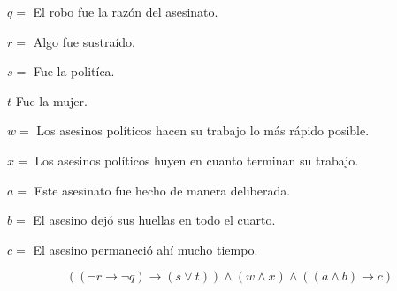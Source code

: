 \documentclass[
]{article}
\begin{document}
\(q=\) El robo fue la razón del asesinato.

\(r=\) Algo fue sustraído.

\(s=\) Fue la politíca.

\(t\) Fue la mujer.

\(w=\) Los asesinos políticos hacen su trabajo lo más rápido posible.

\(x=\) Los asesinos políticos huyen en cuanto terminan su trabajo.

\(a=\) Este asesinato fue hecho de manera deliberada.

\(b=\) El asesino dejó sus huellas en todo el cuarto.

\(c=\) El asesino permaneció ahí mucho tiempo.

\[
((\neg r\rightarrow\neg q)\rightarrow(s\lor t))\land (w\land x)\land ((a\land b)\rightarrow c)
\]
\end{document}
